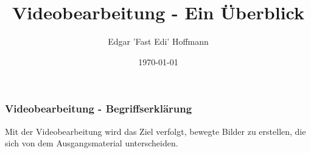 %
%
%




\title[FreieSoftwareOG.org - Videobearbeitung - Ein Überblick]{Videobearbeitung - Ein Überblick} 
\author{Edgar 'Fast Edi' Hoffmann}    %
\date{\today}         %




\begin{frame}      %
  \titlepage        %
\end{frame}


\begin{frame}
\frametitle{Videobearbeitung - Begriffserklärung}

\pause
Mit der Videobearbeitung wird das Ziel verfolgt, bewegte Bilder zu erstellen, die sich von dem Ausgangsmaterial unterscheiden.

\end{frame}

